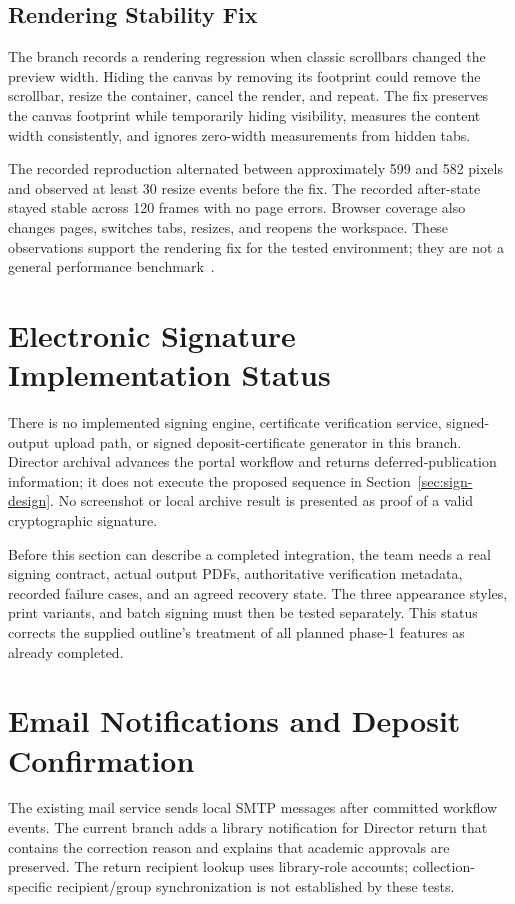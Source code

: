 \documentclass[11pt,a4paper]{report}
\begin{document}
\subsection{Rendering Stability Fix}
The branch records a rendering regression when classic scrollbars changed the preview width. Hiding the canvas by removing its footprint could remove the scrollbar, resize the container, cancel the render, and repeat. The fix preserves the canvas footprint while temporarily hiding visibility, measures the content width consistently, and ignores zero-width measurements from hidden tabs.

The recorded reproduction alternated between approximately 599 and 582 pixels and observed at least 30 resize events before the fix. The recorded after-state stayed stable across 120 frames with no page errors. Browser coverage also changes pages, switches tabs, resizes, and reopens the workspace. These observations support the rendering fix for the tested environment; they are not a general performance benchmark~\cite{pdf-stability}.

\section{Electronic Signature Implementation Status}
There is no implemented signing engine, certificate verification service, signed-output upload path, or signed deposit-certificate generator in this branch. Director archival advances the portal workflow and returns deferred-publication information; it does not execute the proposed sequence in Section~\ref{sec:sign-design}. No screenshot or local archive result is presented as proof of a valid cryptographic signature.

Before this section can describe a completed integration, the team needs a real signing contract, actual output PDFs, authoritative verification metadata, recorded failure cases, and an agreed recovery state. The three appearance styles, print variants, and batch signing must then be tested separately. This status corrects the supplied outline's treatment of all planned phase-1 features as already completed.

\section{Email Notifications and Deposit Confirmation}
The existing mail service sends local SMTP messages after committed workflow events. The current branch adds a library notification for Director return that contains the correction reason and explains that academic approvals are preserved. The return recipient lookup uses library-role accounts; collection-specific recipient/group synchronization is not established by these tests.
\end{document}
